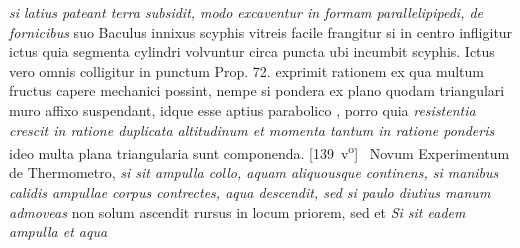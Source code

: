 \textit{si latius pateant terra subsidit, modo excaventur in formam parallelipipedi, de fornicibus} suo 
 Baculus\protect{} innixus scyphis vitreis facile frangitur si in centro infligitur ictus quia segmenta cylindri volvuntur circa puncta ubi incumbit scyphis. Ictus\protect{} vero omnis colligitur in punctum  Prop. 72. exprimit rationem ex qua multum fructus capere mechanici\protect{} possint, nempe si pondera ex plano quodam triangulari muro affixo suspendant, idque esse aptius parabolico 
\protect{},
porro quia \textit{resistentia\protect{} crescit in ratione duplicata altitudinum et momenta tantum in ratione ponderis } ideo multa plana triangularia sunt componenda.
[139~v\textsuperscript{o}]
\pend%
\pstart%
%
%
%
% 
 \,
Novum Experimentum\protect{} de Thermometro\protect{},
\textit{si sit ampulla
 collo,
 
 aquam aliquousque continens,
si manibus calidis ampullae corpus contrectes,
aqua descendit,
sed si paulo diutius manum admoveas} non solum ascendit rursus in locum priorem,
sed et 
\textit{Si sit eadem ampulla et aqua}
 
